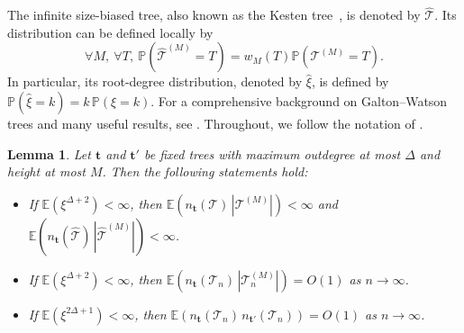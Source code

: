 \documentclass[article]{amsart}
\newcommand{\Prob} {\mathbb {P}}
\newcommand{\prob}[1]{\Prob\left(#1\right)}
\newcommand{\tc}{\mathcal{T}}
\newcommand{\htc}{\hat{\tc}}
\newcommand{\st}{\textbf{t}}
\newcommand{\n}{n_{\st}}
\newcommand{\hxi}{\hat{\xi}}
\newtheorem{lemma}[theorem]{Lemma}
\theoremstyle{definition}
\theoremstyle{remark}
\begin{document}
The infinite size-biased tree, also known as the Kesten tree~\cite{K86}, is denoted by $\htc$. Its distribution can be defined locally by 
\[
\forall M,\  \forall T,\  \prob{\htc^{(M)}=T}=w_M(T)\prob{\tc^{(M)}=T}.
\]
In particular, its root-degree distribution, denoted by $\hxi$, is defined by $\mathbb{P}(\hxi = k) = k\,\mathbb{P}(\xi = k)$. For a comprehensive background on Galton--Watson trees and many useful results, see \cite{J06,J12}. Throughout, we follow the notation of \cite{ralaivaosaona2020}.
\begin{lemma}\label{expectation of products of n(T) with finite tree size}
Let $\st$ and $\st'$ be fixed trees with maximum outdegree at most $\Delta$ and height at most $M$. Then the following statements hold:
\begin{itemize}
\item[(a)] If $\mathbb{E}(\xi^{\Delta+2}) < \infty$, then $\mathbb{E}(\n(\tc)\,|\tc^{(M)}|) < \infty$ and $\mathbb{E}(\n(\htc)\,|\htc^{(M)}|) < \infty$.\label{st:a}
\item[(b)] If $\mathbb{E}(\xi^{\Delta+2}) < \infty$, then $\mathbb{E}(\n(\tc_n)\,|\tc_n^{(M)}|) = O(1)$ as $n \to \infty$.
\item[(c)] If $\mathbb{E}(\xi^{2\Delta+1}) < \infty$, then $\mathbb{E}(n_{\st}(\tc_n)\,n_{\st'}(\tc_n)) = O(1)$ as $n \to \infty$.
\end{itemize}
\end{lemma}
\end{document}
